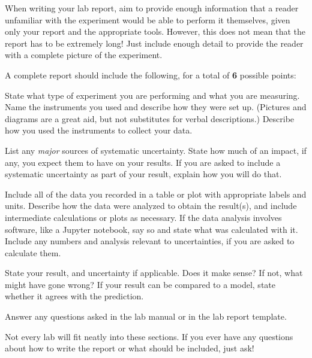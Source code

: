 \documentclass[12pt]{article}
\begin{document}
When writing your lab report, aim to provide enough information that a reader unfamiliar with the experiment would be able to perform it themselves, given only your report and the appropriate tools.  However, this does not mean that the report has to be extremely long!  Just include enough detail to provide the reader with a complete picture of the experiment.

\bigskip

A complete report should include the following, for a total of \textbf{6} possible points:

\medskip
\begin{description}[style=nextline]
	\item[(1.5) Experimental setup and procedure]
	
	State what type of experiment you are performing and what you are measuring.  Name the instruments you used and describe how they were set up.  (Pictures and diagrams are a great aid, but not substitutes for verbal descriptions.)  Describe how you used the instruments to collect your data.

\medskip
\item[(0.5) Experimental uncertainties]

	List any \emph{major} sources of systematic uncertainty.  State how much of an impact, if any, you expect them to have on your results.  If you are asked to include a systematic uncertainty as part of your result, explain how you will do that.

\medskip
\item[(1.5) Data and data analysis]

	Include all of the data you recorded in a table or plot with appropriate labels and units.  Describe how the data were analyzed to obtain the result(s), and include intermediate calculations or plots as necessary.  If the data analysis involves software, like a Jupyter notebook, say so and state what was calculated with it.  Include any numbers and analysis relevant to uncertainties, if you are asked to calculate them.

\medskip
\item[(1.5) Conclusion]

	State your result, and uncertainty if applicable.  Does it make sense?  If not, what might have gone wrong?  If your result can be compared to a model, state whether it agrees with the prediction.
	
\medskip
\item[(1.0) Questions]

	Answer any questions asked in the lab manual or in the lab report template.
	
\end{description}
\bigskip

Not every lab will fit neatly into these sections.  If you ever have any questions about how to write the report or what should be included, just ask!
\end{document}
